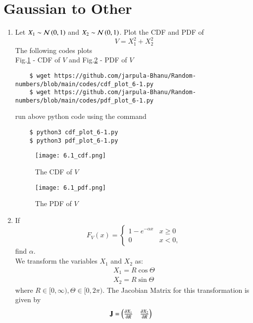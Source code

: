 \documentclass[journal,12pt,twocolumn]{IEEEtran}
\renewcommand\thesection{\arabic{section}}
\begin{document}
\section{Gaussian to Other}
\begin{enumerate}[label=\thesection.\arabic*
,ref=\thesection.\theenumi]
\item
Let $X_1 \sim  \mathcal{N}\left(0,1\right)$ and $X_2 \sim  \mathcal{N}\left(0,1\right)$. Plot the CDF and PDF of
%
\begin{equation}
V = X_1^2 + X_2^2
\end{equation}
\solution The following codes plots\\
 Fig.\ref{fig:6.1_cdf} - CDF of $V$ and Fig.\ref{fig:6.1_pdf} - PDF of $V$
\begin{lstlisting}
    $ wget https://github.com/jarpula-Bhanu/Random-numbers/blob/main/codes/cdf_plot_6-1.py
    $ wget https://github.com/jarpula-Bhanu/Random-numbers/blob/main/codes/pdf_plot_6-1.py
\end{lstlisting}
run above python code using the command
\begin{lstlisting}
    $ python3 cdf_plot_6-1.py
    $ python3 pdf_plot_6-1.py
\end{lstlisting}
\begin{figure}[h]
    \centering
    \texttt{[image: 6.1\_cdf.png]}
    \caption{The CDF of $V$}
    \label{fig:6.1_cdf}
\end{figure}
\begin{figure}[h]
    \centering
    \texttt{[image: 6.1\_pdf.png]}
    \caption{The PDF of $V$}
    \label{fig:6.1_pdf}
\end{figure}
%
%
%
\item
If
%
\begin{equation}
F_{V}(x) = 
\begin{cases}
1 - e^{-\alpha x} & x \geq 0 \\
0 & x < 0,
\end{cases}
\end{equation}
%
find $\alpha$.\\
\solution 
We transform the variables $X_1$ and $X_2$ as:
		\begin{align}
			X_1 = R\cos{\Theta} \\
			X_2 = R\sin{\Theta}
		\end{align}
where $R \in [0, \infty), \Theta \in [0, 2\pi)$. The Jacobian Matrix for this transformation is given by
		\begin{align}
			\mathbf{J} &= \begin{pmatrix}\frac{\partial X_1}{\partial R} & \frac{\partial X_2}{\partial R} \\
\end{pmatrix}
\end{align}
\end{enumerate}
\end{document}
